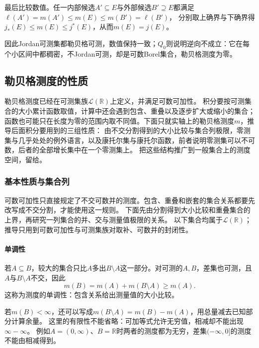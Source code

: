 最后比较数值。任一内部候选$A'\subseteq E$与外部候选$B'\supseteq E$都满足$\ell(A')=m(A')\leq m(E)\leq m(B')=\ell(B')$，
分别取上确界与下确界得$j_*(E)\leq m(E)\leq j^*(E)$，从而$m(E)=j(E)$。

因此Jordan可测集都勒贝格可测，数值保持一致；$Q_0$则说明逆向不成立：它在每个小区间中都稠密，不Jordan可测，却是可数Borel集合，勒贝格测度为零。

\subsection{勒贝格测度的性质}
\label{sec:comb-measurable-sets-and-weights}

勒贝格测度已经在可测集族$\mathcal L(\mathbb R)$上定义，并满足可数可加性。
积分要按可测集合的大小累计函数取值，计算中还会遇到包含、重叠以及逐步扩大或缩小的集合；
函数也可能只在长度为零的范围内取不同值。下面只就实轴上的勒贝格测度$m$，推导后面积分要用到的三组性质：
由不交分割得到的大小比较与集合列极限，零测集与几乎处处的例外语言，以及康托尔集与康托尔函数，前者说明零测集可以不可数，后者的全部增长集中在一个零测集上。
把这些结构推广到一般集合上的测度空间，留给。

\subsubsection{基本性质与集合列}
\label{sec:comb-set-approximation}
\label{sec:analysis-set-measure-continuity}

可数可加性只直接规定了不交可数并的测度。包含、重叠和嵌套的集合关系都要先改写成不交分割，才能使用这一规则。
下面先由分割得到大小比较和重叠集合的上界，再研究一列集合的并、交与测量值极限的关系。
以下集合均属于$\mathcal L(\mathbb R)$；推导只用到可数可加性与可测集族对取补、可数并的封闭性。

\paragraph{单调性}

若$A\subseteq B$，较大的集合只比$A$多出$B\setminus A$这一部分。对可测的$A,B$，差集也可测，且$A$与$B\setminus A$不交，因此
\[
 m(B)=m(A)+m(B\setminus A)\geq m(A).
\]
这称为测度的单调性：包含关系给出测量值的大小比较。

若$m(B)<\infty$，还可以写成$m(B\setminus A)=m(B)-m(A)$，用总量减去已知部分计算余量。
这里的有限性不能省略：可加等式允许无穷值，相减却不能出现$\infty-\infty$。
例如$A=(0,\infty)$、$B=\mathbb R$时两者的测度都为无穷，差集$(-\infty,0]$的测度不能由相减得到。

